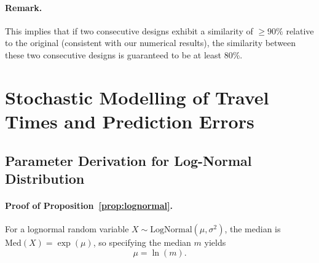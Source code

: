 \documentclass[a4paper,fleqn]{cas-sc}
\begin{document}
\paragraph{Remark.}
This implies that if two consecutive designs exhibit a similarity of $\geq 90\%$ relative to the original (consistent with our numerical results), the similarity between these two consecutive designs is guaranteed to be at least 80\%.
%
\section{Stochastic Modelling of Travel Times and Prediction Errors}

\subsection{Parameter Derivation for Log-Normal Distribution}\label{Appendix:log_normal}

\paragraph{Proof of Proposition~\ref{prop:lognormal}.}
For a lognormal random variable $X \sim \mathrm{LogNormal}(\mu,\sigma^{2})$,  
the median is $\mathrm{Med}(X)=\exp(\mu)$, so specifying the median $m$ yields
\[
\mu = \ln(m).
\]
\end{document}
